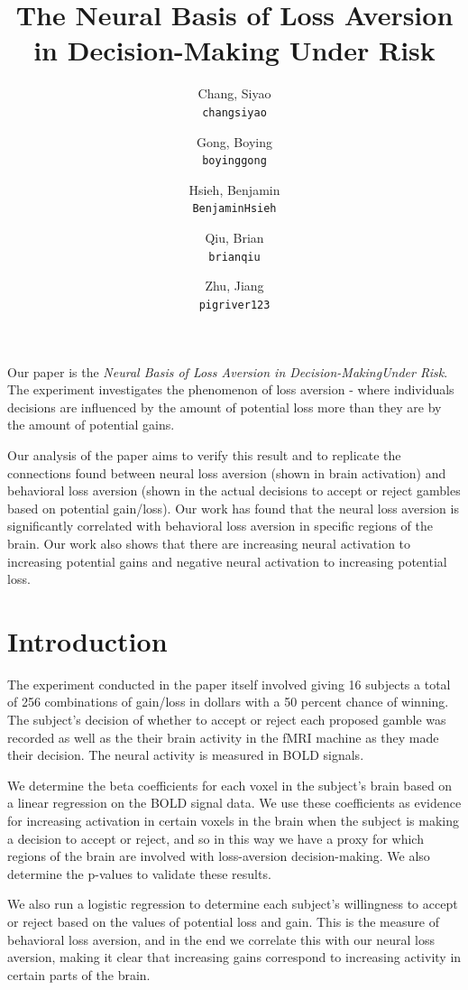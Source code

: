 \documentclass[11pt]{article}
\title{The Neural Basis of Loss Aversion in Decision-Making Under Risk}
\author{
  Chang, Siyao \\
  \texttt{changsiyao}
  \and
  Gong, Boying\\
  \texttt{boyinggong}
  \and
  Hsieh, Benjamin\\
  \texttt{BenjaminHsieh}
  \and
  Qiu, Brian\\
  \texttt{brianqiu}
  \and
  Zhu, Jiang\\
  \texttt{pigriver123}
}
\begin{document}
\maketitle

\par Our paper is the \textit{Neural Basis of Loss Aversion in Decision-MakingUnder Risk}.
The experiment investigates the 
phenomenon of loss aversion - where individuals decisions are influenced by the
amount of potential loss more than they are by the amount of potential gains. 

\par 
Our analysis of the paper aims to verify this result and to replicate the connections found between neural loss aversion (shown in brain activation) and behavioral loss aversion (shown in the actual decisions to accept or reject gambles based on potential gain/loss). Our work has found that the neural loss aversion is significantly correlated with behavioral loss aversion in specific regions of the brain. Our work also shows that there are increasing neural activation to increasing potential gains and negative neural activation to increasing potential loss.

\section{Introduction}
The experiment conducted in the paper itself involved giving 16 subjects a total of 256 combinations of gain/loss in dollars with a 50 percent chance of winning. The subject's decision of whether to accept or reject each proposed gamble was recorded as well as the their brain activity in the fMRI machine as they made their decision. The neural activity is measured in BOLD signals.

\par 
We determine the beta coefficients for each voxel in the subject's brain based on a linear regression on the BOLD signal data. We use these coefficients as evidence for increasing activation in certain voxels in the brain when the subject is making a decision to accept or reject, and so in this way we have a proxy for which regions of the brain are involved with loss-aversion decision-making. We also determine the p-values to validate these results.

\par 
We also run a logistic regression to determine each subject's willingness to accept or reject based on the values of potential loss and gain. This is the measure of behavioral loss aversion, and in the end we correlate this with our neural loss aversion, making it clear that increasing gains correspond to increasing activity in certain parts of the brain.  
\end{document}
